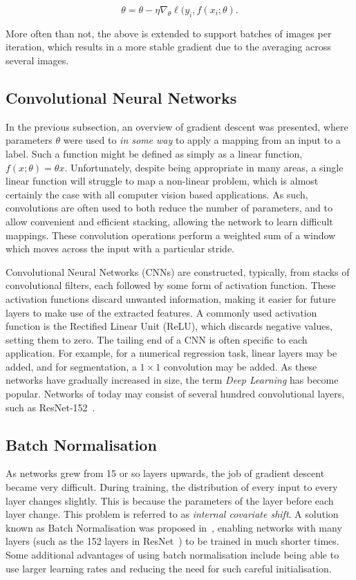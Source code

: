 \begin{equation}
  \theta = \theta - \eta \nabla_\theta \ell(y_i, f(x_i ; \theta) .
\end{equation}

More often than not, the above is extended to support batches of
images per iteration, which results in a more stable gradient due to
the averaging across several images.

\subsection{Convolutional Neural Networks}

In the previous subsection, an overview of gradient descent was
presented, where parameters $\theta$ were used to \textit{in some way}
to apply a mapping from an input to a label. Such a function might be
defined as simply as a linear function, $f(x;\theta) = \theta
x$. Unfortunately, despite being appropriate in many areas, a single
linear function will struggle to map a non-linear problem, which is
almost certainly the case with all computer vision based
applications. As such, convolutions are often used to both reduce the
number of parameters, and to allow convenient and efficient stacking,
allowing the network to learn difficult mappings. These convolution
operations perform a weighted sum of a window which moves across the
input with a particular stride.

Convolutional Neural Networks (CNNs) are constructed, typically, from
stacks of convolutional filters, each followed by some form of
activation function. These activation functions discard unwanted
information, making it easier for future layers to make use of the
extracted features. A commonly used activation function is the
Rectified Linear Unit (ReLU), which discards negative values, setting
them to zero. The tailing end of a CNN is often specific to each
application. For example, for a numerical regression task, linear
layers may be added, and for segmentation, a $1\times 1$ convolution
may be added. As these networks have gradually increased in size, the
term \textit{Deep Learning} has become popular. Networks of today may
consist of several hundred convolutional layers, such as
ResNet-152~\cite{he2015deep}.

\subsection{Batch Normalisation}

As networks grew from 15 or so layers upwards, the job of gradient
descent became very difficult. During training, the distribution of
every input to every layer changes slightly. This is because the
parameters of the layer before each layer change. This problem is
referred to as \textit{internal covariate shift}. A solution known as
Batch Normalisation was proposed in~\cite{ioffe2015batch}, enabling
networks with many layers (such as the 152 layers in
ResNet~\cite{he2015deep}) to be trained in much shorter times. Some
additional advantages of using batch normalisation include being able
to use larger learning rates and reducing the need for such careful
initialisation.

